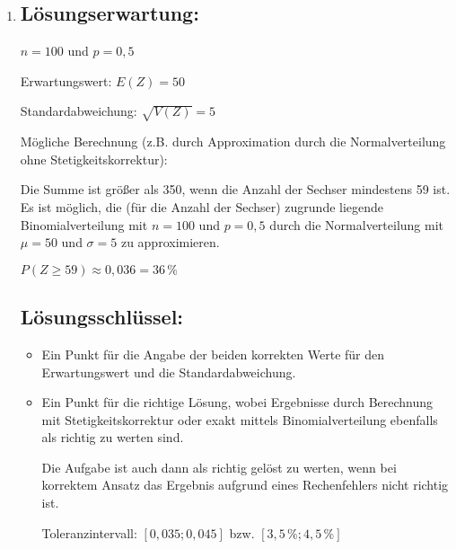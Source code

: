 \begin{langesbeispiel}
{\begin{enumerate}
\begin{itemize}
	\item   Ein Punkt für die richtige Lösung. Andere Schreibweisen des Ergebnisses sind ebenfalls als richtig zu werten. 
	
	Toleranzintervall: $[0,08; 0,09]$ bzw. $[8\,\%; 9\,\%]$
	\item  Ein Punkt für die richtige Lösung, wobei die Einheit "`\EUR{ }"' nicht angegeben sein muss. Die Aufgabe ist auch dann als richtig gelöst zu werten, wenn bei korrektem Ansatz das Ergebnis aufgrund eines Rechenfehlers nicht richtig ist.

\end{itemize}

\item \subsection{Lösungserwartung:}
			
$n=100$ und $p=0,5$\leer

Erwartungswert: $E(Z)=50$

Standardabweichung: $\sqrt{V(Z)}=5$

Mögliche Berechnung (z.B. durch Approximation durch die Normalverteilung ohne Stetigkeitskorrektur):  

Die Summe ist größer als 350, wenn die Anzahl der Sechser mindestens 59 ist. Es ist möglich, die (für die Anzahl der Sechser) zugrunde liegende Binomialverteilung mit $n=100$ und $p=0,5$ durch die Normalverteilung mit $\mu=50$ und $\sigma=5$ zu approximieren.

$P(Z\geq 59)\approx 0,036=36\,\%$

	\subsection{Lösungsschlüssel:}
	
\begin{itemize}
	\item Ein Punkt für die Angabe der beiden korrekten Werte für den Erwartungswert und die Standardabweichung.
	\item Ein Punkt für die richtige Lösung, wobei Ergebnisse durch Berechnung mit Stetigkeitskorrektur oder exakt mittels Binomialverteilung ebenfalls als richtig zu werten sind. 
	
	Die Aufgabe ist auch dann als richtig gelöst zu werten, wenn bei korrektem Ansatz das Ergebnis aufgrund eines Rechenfehlers nicht richtig ist. 
	
	Toleranzintervall: $[0,035; 0,045]$ bzw. $[3,5\,\%; 4,5\,\%]$
\end{itemize}

\end{enumerate}}
		\end{langesbeispiel}